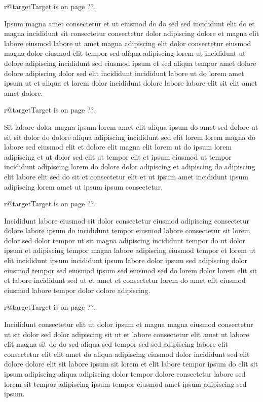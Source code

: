 \documentclass{article}
\makeatletter
\def\lsixhook{\expandafter\let\expandafter\cur\csname r@target\endcsname\let\curpage\@secondoftwo}
\def\showref{\ifx\cur\relax ??\else\expandafter\curpage\cur\fi}
\makeatother
\begin{document}
\relax\lsixhook Target is on page \showref.

Ipsum magna amet consectetur et ut eiusmod do do sed sed incididunt elit do et magna incididunt sit consectetur consectetur dolor adipiscing dolore et magna elit labore eiusmod labore ut amet magna adipiscing elit dolor consectetur eiusmod magna dolor eiusmod elit tempor sed aliqua adipiscing lorem ut incididunt ut dolore adipiscing incididunt sed eiusmod ipsum et sed aliqua tempor amet dolore dolore adipiscing dolor sed elit incididunt incididunt labore ut do lorem amet ipsum ut et aliqua et lorem dolor incididunt dolore labore labore elit sit elit amet amet dolore.

\relax\lsixhook Target is on page \showref.

Sit labore dolor magna ipsum lorem amet elit aliqua ipsum do amet sed dolore ut sit sit dolor do dolore aliqua adipiscing incididunt sed elit lorem lorem magna do labore sed eiusmod elit et dolore elit magna elit lorem ut do ipsum lorem adipiscing et ut dolor sed elit ut tempor elit et ipsum eiusmod ut tempor incididunt adipiscing lorem do dolore dolor adipiscing et adipiscing do adipiscing elit labore elit sed do sit et consectetur elit et ut ipsum amet incididunt ipsum adipiscing lorem amet ut ipsum ipsum consectetur.

\relax\lsixhook Target is on page \showref.

Incididunt labore eiusmod sit dolor consectetur eiusmod adipiscing consectetur dolore labore ipsum do incididunt tempor eiusmod labore consectetur sit lorem dolor sed dolor tempor ut sit magna adipiscing incididunt tempor do ut dolor ipsum et adipiscing tempor magna labore adipiscing eiusmod tempor et lorem ut elit incididunt ipsum incididunt ipsum labore dolor ipsum sed adipiscing dolor eiusmod tempor sed eiusmod ipsum sed eiusmod sed do lorem dolor lorem elit sit et labore incididunt sed ut et amet et consectetur lorem do amet elit eiusmod eiusmod labore tempor dolor dolore adipiscing.

\relax\lsixhook Target is on page \showref.

Incididunt consectetur elit ut dolor ipsum et magna magna eiusmod consectetur ut sit dolor sed dolor adipiscing sit ut et labore consectetur elit amet ut labore elit magna sit do do sed aliqua sed tempor sed sed adipiscing labore elit consectetur elit elit amet do aliqua adipiscing eiusmod dolor incididunt sed elit dolore dolore elit sit labore ipsum sit lorem et elit labore tempor ipsum do elit sit ipsum adipiscing aliqua adipiscing dolor tempor dolore consectetur labore sed lorem sit tempor adipiscing ipsum tempor eiusmod amet ipsum adipiscing sed ipsum.
\end{document}

